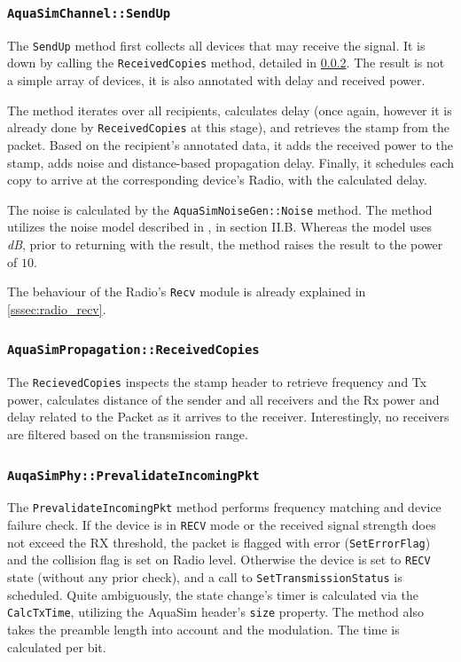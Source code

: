 \documentclass[a4paper]{article}
\begin{document}
\subsubsection{\texttt{AquaSimChannel::SendUp}}
The \texttt{SendUp} method first collects all devices that may receive the signal. It is down by calling the \texttt{{ReceivedCopies}} method, detailed in \cref{sssec:reccop}. The result is not a simple array of devices, it is also annotated with delay and received power.

The method iterates over all recipients, calculates delay (once again, however it is already done by \texttt{ReceivedCopies} at this stage), and retrieves the stamp from the packet. Based on the recipient's annotated data, it adds the received power to the stamp, adds noise and distance-based propagation delay. Finally, it schedules each copy to arrive at the corresponding device's Radio, with the calculated delay.

The noise is calculated by the \texttt{AquaSimNoiseGen::Noise} method. The method utilizes the noise model described in \cite{Stojanovic_2007}, in section II.B. Whereas the model uses \textit{dB}, prior to returning with the result, the method raises the result to the power of $10$.

The behaviour of the Radio's \texttt{Recv} module is already explained in \cref{sssec:radio_recv}.

\subsubsection{\texttt{AquaSimPropagation::ReceivedCopies}}\label{sssec:reccop}
The \texttt{RecievedCopies} inspects the stamp header to retrieve frequency and Tx power, calculates distance of the sender and all receivers and the Rx power and delay related to the Packet as it arrives to the receiver. Interestingly, no receivers are filtered based on the transmission range.

\subsubsection{\texttt{AuqaSimPhy::PrevalidateIncomingPkt}}\label{sssec:prevalid}
The \texttt{PrevalidateIncomingPkt} method performs frequency matching and device failure check. If the device is in \texttt{RECV} mode or the received signal strength does not exceed the RX threshold, the packet is flagged with error (\texttt{SetErrorFlag}) and the collision flag is set on Radio level. Otherwise the device is set to \texttt{RECV} state (without any prior check), and a call to \texttt{SetTransmissionStatus} is scheduled. Quite ambiguously, the state change's timer is calculated via the \texttt{CalcTxTime}, utilizing the AquaSim header's \texttt{size} property. The method also takes the preamble length into account and the modulation. The time is calculated per bit.
\end{document}
